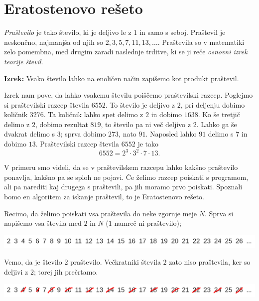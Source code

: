 \documentclass{book}
\begin{document}
\section{Eratostenovo rešeto}

\emph{Praštevilo} je tako število, ki je deljivo le z $1$ in samo s seboj.
Praštevil je neskončno, najmanjša od njih so $2, 3, 5, 7, 11, 13, \ldots$.
Praštevila so v matematiki zelo pomembna, med drugim zaradi naslednje trditve,
ki se ji reče \emph{osnovni izrek teorije števil}.

\vspace{0.5cm}

\textbf{Izrek:} Vsako število lahko na enoličen način zapišemo kot produkt
praštevil.

\begin{examples}
  Izrek nam pove, da lahko vsakemu številu poiščemo praštevilski razcep.
  Poglejmo si praštevilski razcep števila $6552$.
  To število je deljivo z $2$, pri deljenju dobimo količnik $3276$.
  Ta količnik lahko spet delimo z $2$ in dobimo $1638$.
  Ko še tretjič delimo z $2$, dobimo rezultat $819$, to število pa ni več
  deljivo z $2$.
  Lahko ga še dvakrat delimo s $3$; sprva dobimo $273$, nato $91$.
  Naposled lahko $91$ delimo s $7$ in dobimo $13$.
  Praštevilski razcep števila $6552$ je tako
  \[
	6552 = 2^3 \cdot 3^2 \cdot 7 \cdot 13.
  \]
\end{examples}

V primeru smo videli, da se v praštevilskem razcepu lahko kakšno praštevilo
ponavlja, kakšno pa se sploh ne pojavi.
Če želimo razcep poiskati s programom, ali pa narediti kaj drugega s praštevili,
pa jih moramo prvo poiskati.
Spoznali bomo en algoritem za iskanje praštevil, to je Eratostenovo rešeto.

Recimo, da želimo poiskati vsa praštevila do neke zgornje meje $N$.
Sprva si napišemo vsa števila med $2$ in $N$ ($1$ namreč ni praštevilo);

\includegraphics[width=\linewidth]{chapters/teorija-stevil/slike/reseto1}

Vemo, da je število $2$ praštevilo.
Večkratniki števila $2$ zato niso praštevila, ker so deljivi z $2$; torej jih
prečrtamo.

\includegraphics[width=\linewidth]{chapters/teorija-stevil/slike/reseto2}
\end{document}
